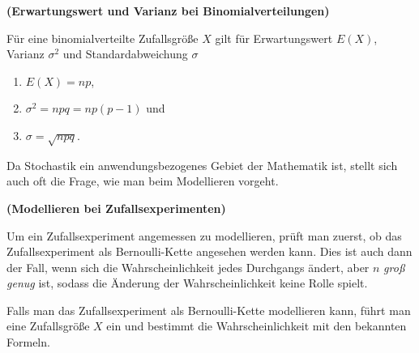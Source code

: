 \documentclass[ngerman, 12pt]{nssheetxea}
\begin{document}
\begin{theorem} \textbf{(Erwartungswert und Varianz bei Binomialverteilungen)} \par
Für eine binomialverteilte Zufallsgröße $X$ gilt für Erwartungswert $E(X)$, Varianz $\sigma^2$ und Standardabweichung $\sigma$
\begin{enumerate}
\item $E(X)=np$,
\item $\sigma^2=npq = np(p-1)$ und
\item $\sigma=\sqrt{npq}$.
\end{enumerate}
\end{theorem}

Da Stochastik ein anwendungsbezogenes Gebiet der Mathematik ist, stellt sich auch oft die Frage, wie man beim Modellieren vorgeht. 

\begin{theorem} \textbf{(Modellieren bei Zufallsexperimenten)} \par
Um ein Zufallsexperiment angemessen zu modellieren, prüft man zuerst, ob das Zufallsexperiment als Bernoulli-Kette angesehen werden kann. Dies ist auch dann der Fall, wenn sich die Wahrscheinlichkeit jedes Durchgangs ändert, aber $n$ \textit{groß genug} ist, sodass die Änderung der Wahrscheinlichkeit keine Rolle spielt. \par
Falls man das Zufallsexperiment als Bernoulli-Kette modellieren kann, führt man eine Zufallsgröße $X$ ein und bestimmt die Wahrscheinlichkeit mit den bekannten Formeln.
\end{theorem}
\end{document}
